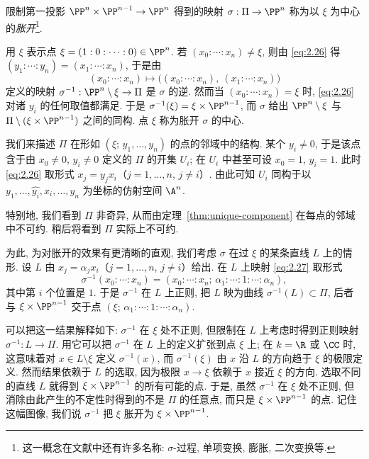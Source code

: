 \begin{definition}[胀开]\label{def:blowup}
	限制第一投影 $\PP^n \times \PP^{n-1} \to \PP^n$ 得到的映射 $\sigma: \Pi \to \PP^n$ 称为以 $\xi$ 为中心的\emph{胀开}\footnote{这一概念在文献中还有许多名称: $\sigma$-过程, 单项变换, 膨胀, 二次变换等.}.
\end{definition}

用 $\xi$ 表示点 $\xi = (1 : 0 : \cdots : 0) \in \PP^n$. 若 $(x_0 : \cdots : x_n) \ne \xi$, 则由 \eqref{eq:2.26} 得 $(y_1 : \cdots : y_n) = (x_1 : \cdots : x_n)$, 于是由
\begin{equation}
	\label{eq:2.27}
	(x_0 : \cdots : x_n) \mapsto \bigl( (x_0 : \cdots : x_n),\ (x_1 : \cdots : x_n) \bigr)
\end{equation}
定义的映射 $\sigma^{-1}: \PP^n \setminus \xi \to \Pi$ 是 $\sigma$ 的逆. 然而当 $(x_0 : \cdots : x_n) = \xi$ 时, \eqref{eq:2.26} 对诸 $y_i$ 的任何取值都满足. 于是 $\sigma^{-1}(\xi) = \xi \times \PP^{n-1}$, 而 $\sigma$ 给出 $\PP^n \setminus \xi$ 与 $\Pi \setminus (\xi \times \PP^{n-1})$ 之间的同构. 点 $\xi$ 称为胀开 $\sigma$ 的中心.

我们来描述 $\Pi$ 在形如 $(\xi;\, y_1, \ldots, y_n)$ 的点的邻域中的结构. 某个 $y_i \ne 0$, 于是该点含于由 $x_0 \ne 0$, $y_i \ne 0$ 定义的 $\Pi$ 的开集 $U_i$; 在 $U_i$ 中甚至可设 $x_0 = 1$, $y_i = 1$. 此时 \eqref{eq:2.26} 取形式 $x_j = y_j x_i$（$j = 1, \ldots, n$, $j \ne i$）. 由此可知 $U_i$ 同构于以 $y_1, \ldots, \widehat{y_i}, x_i, \ldots, y_n$ 为坐标的仿射空间 $\A^n$.

特别地, 我们看到 $\Pi$ 非奇异, 从而由定理~\ref{thm:unique-component} 在每点的邻域中不可约. 稍后将看到 $\Pi$ 实际上不可约.

为此, 为对胀开的效果有更清晰的直观, 我们考虑 $\sigma$ 在过 $\xi$ 的某条直线 $L$ 上的情形. 设 $L$ 由 $x_j = \alpha_j x_i$（$j = 1, \ldots, n$, $j \ne i$）给出. 在 $L$ 上映射 \eqref{eq:2.27} 取形式
\[
	\sigma^{-1}(x_0 : \cdots : x_n) = (x_0 : \cdots : x_n;\, \alpha_1 : \cdots : 1 : \cdots : \alpha_n),
\]
其中第 $i$ 个位置是 $1$. 于是 $\sigma^{-1}$ 在 $L$ 上正则, 把 $L$ 映为曲线 $\sigma^{-1}(L) \subset \Pi$, 后者与 $\xi \times \PP^{n-1}$ 交于点 $(\xi;\, \alpha_1 : \cdots : 1 : \cdots : \alpha_n)$.

可以把这一结果解释如下: $\sigma^{-1}$ 在 $\xi$ 处不正则, 但限制在 $L$ 上考虑时得到正则映射 $\sigma^{-1}: L \to \Pi$. 用它可以把 $\sigma^{-1}$ 在 $L$ 上的定义扩张到点 $\xi$ 上; 在 $k = \R$ 或 $\CC$ 时, 这意味着对 $x \in L \setminus \xi$ 定义 $\sigma^{-1}(x)$, 而 $\sigma^{-1}(\xi)$ 由 $x$ 沿 $L$ 的方向趋于 $\xi$ 的极限定义. 然而结果依赖于 $L$ 的选取, 因为极限 $x \to \xi$ 依赖于 $x$ 接近 $\xi$ 的方向. 选取不同的直线 $L$ 就得到 $\xi \times \PP^{n-1}$ 的所有可能的点. 于是, 虽然 $\sigma^{-1}$ 在 $\xi$ 处不正则, 但消除由此产生的不定性时得到的不是 $\Pi$ 的任意点, 而只是 $\xi \times \PP^{n-1}$ 的点. 记住这幅图像, 我们说 $\sigma^{-1}$ 把 $\xi$ 胀开为 $\xi \times \PP^{n-1}$.

